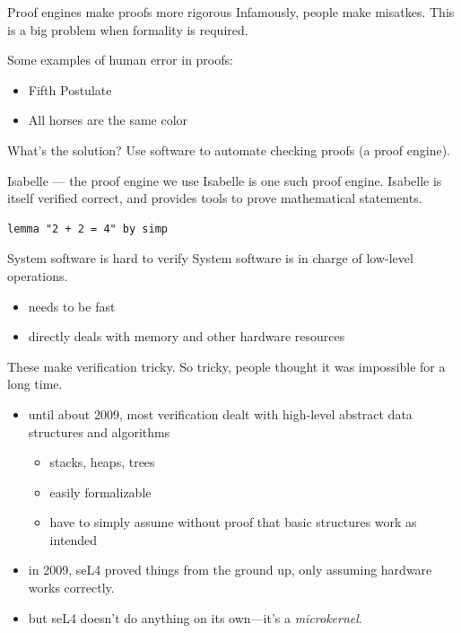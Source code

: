 \documentclass{beamer}
\begin{document}
\begin{frame}{Proof engines make proofs more rigorous}
    Infamously, people make misatkes.
    This is a big problem when formality is required.

    Some examples of human error in proofs:
    \begin{itemize}
        \item Fifth Postulate
        \item All horses are the same color
    \end{itemize}

    What's the solution?
    Use software to automate checking proofs (a proof engine).

\end{frame}

\begin{frame}[fragile]{Isabelle --- the proof engine we use}
    Isabelle is one such proof engine.
    Isabelle is itself verified correct, and provides tools to prove mathematical statements.
    \begin{lstlisting}
lemma "2 + 2 = 4" by simp
    \end{lstlisting}
\end{frame}


\begin{frame}{System software is hard to verify}
    System software is in charge of low-level operations.
    \begin{itemize}
        \item needs to be fast
        \item directly deals with memory and other hardware resources
    \end{itemize}
    These make verification tricky.
    So tricky, people thought it was impossible for a long time.
    \begin{itemize}
        \item until about 2009, most verification dealt with high-level abstract data structures and algorithms
        \begin{itemize}
            \item stacks, heaps, trees
            \item easily formalizable
            \item have to simply assume without proof that basic structures work as intended
        \end{itemize}
        \item in 2009, seL4 proved things from the ground up, only assuming hardware works correctly.
        \item but seL4 doesn't do anything on its own---it's a \textit{microkernel}.
    \end{itemize}
\end{frame}
\end{document}
